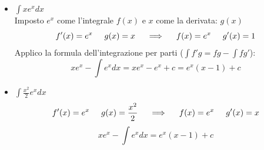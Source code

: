 \begin{example}\phantom{}
\begin{itemize}
    \item $\int xe^xdx$\\Imposto $e^x$ come l'integrale $f(x)$ e $x$ come la derivata: $g(x)$\begin{equation*}f'(x)=e^x\hspace{.5cm}g(x)=x\hspace{.5cm}\Longrightarrow\hspace{.5cm}f(x)=e^x\hspace{.5cm}g'(x)=1\end{equation*}Applico la formula dell'integrazione per parti ($\int f'g=fg-\int fg'$):\begin{equation*}xe^x-\int e^xdx=xe^x-e^x+c=e^x(x-1)+c\end{equation*}
    
    \item $\int\frac{x^2}{2}e^xdx$\begin{equation*}f'(x)=e^x\hspace{.5cm}g(x)=\frac{x^2}{2}\hspace{.5cm}\Longrightarrow\hspace{.5cm}f(x)=e^x\hspace{.5cm}g'(x)=x\end{equation*}\begin{equation*}xe^x-\int e^xdx=e^x(x-1)+c\end{equation*}
    
    
\end{itemize}
\end{example}

